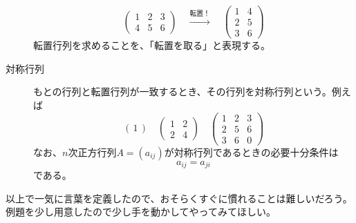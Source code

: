 \documentclass[10pt]{jsarticle}
\theoremstyle{definition}%
\newcommand{\kakko}[1]{\left(#1 \right)} %
\numberwithin{equation}{section}%
\begin{document}
\begin{framed}
\begin{description}
    \begin{equation}
      \left( 
        \begin{matrix}
          1 & 2 & 3 \\
          4 & 5 & 6 
        \end{matrix}
      \right) \quad \overset{転置！}{\to} \quad\left( 
        \begin{matrix}
          1 & 4  \\
          2 & 5   \\
          3 & 6 
        \end{matrix}
      \right)
    \end{equation}
    転置行列を求めることを、「転置を取る」と表現する。
  \item[対称行列] もとの行列と転置行列が一致するとき、その行列を対称行列という。例えば
  \begin{equation}
 \label{taisho}   \kakko{ \, 1 \, }\quad \left( 
      \begin{matrix}
        1 & 2  \\
        2 & 4  
      \end{matrix}
    \right) \quad \left( 
      \begin{matrix}
        1 & 2 & 3 \\
        2 & 5 & 6 \\
        3 & 6 & 0
      \end{matrix}
    \right)
  \end{equation}
  なお、$n$次正方行列$A=(a_{ij})$が対称行列であるときの必要十分条件は
  \begin{equation}
    a_{ij}=a_{ji}
  \end{equation}
  である。
\end{description}
\end{framed}
以上で一気に言葉を定義したので、おそらくすぐに慣れることは難しいだろう。例題を少し用意したので少し手を動かしてやってみてほしい。
\end{document}
